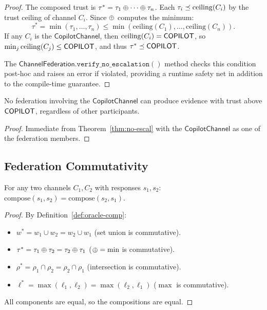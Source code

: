 \documentclass[11pt]{article}
\newcommand{\OracleComp}{\mathrm{compose}}
\newcommand{\CopChan}{\mathsf{CopilotChannel}}
\newcommand{\ChanFed}{\mathsf{ChannelFederation}}
\newcommand{\TrustCeil}{\mathrm{ceiling}}
\begin{document}
\begin{proof}
The composed trust is $\tau^* = \tau_1 \oplus \cdots \oplus \tau_n$.
Each $\tau_i \tleq \TrustCeil(C_i)$ by the trust ceiling of
channel $C_i$.  Since $\oplus$ computes the minimum:
\[
  \tau^* = \min(\tau_1, \ldots, \tau_n)
  \leq \min(\TrustCeil(C_1), \ldots, \TrustCeil(C_n)).
\]
If any $C_i$ is the $\CopChan$, then
$\TrustCeil(C_i) = \Tcopilot$, so
$\min_j \TrustCeil(C_j) \leq \Tcopilot$, and thus
$\tau^* \preceq \mathsf{COPILOT}$.

The $\ChanFed.\texttt{verify\_no\_escalation}()$ method
checks this condition post-hoc and raises an error if violated,
providing a runtime safety net in addition to the compile-time
guarantee.
\end{proof}

\begin{corollary}
\label{cor:cop-noescal}
No federation involving the $\CopChan$ can produce evidence
with trust above $\mathsf{COPILOT}$, regardless of other participants.
\end{corollary}

\begin{proof}
Immediate from Theorem~\ref{thm:no-escal} with the $\CopChan$
as one of the federation members.
\end{proof}

\subsection{Federation Commutativity}
\label{sec:formal:comm}

\begin{theorem}
\label{thm:fed-comm}
For any two channels $C_1, C_2$ with responses $s_1, s_2$:
$\OracleComp(s_1, s_2) = \OracleComp(s_2, s_1)$.
\end{theorem}

\begin{proof}
By Definition~\ref{def:oracle-comp}:
\begin{itemize}
\item $w^* = w_1 \cup w_2 = w_2 \cup w_1$ (set union is commutative).
\item $\tau^* = \tau_1 \oplus \tau_2 = \tau_2 \oplus \tau_1$
  ($\oplus = \min$ is commutative).
\item $\rho^* = \rho_1 \cap \rho_2 = \rho_2 \cap \rho_1$
  (intersection is commutative).
\item $\ell^* = \max(\ell_1, \ell_2) = \max(\ell_2, \ell_1)$
  ($\max$ is commutative).
\end{itemize}
All components are equal, so the compositions are equal.
\end{proof}
\end{document}
